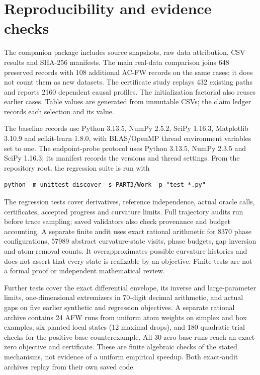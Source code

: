 \section{Reproducibility and evidence checks}
\label{app:reproduction}
The companion package includes source snapshots, raw data attribution,
CSV results and SHA-256 manifests. The main real-data comparison
joins 648 preserved records with 108 additional AC-FW records on the
same cases; it does not count them as new datasets.
The certificate study replays 432 existing paths and reports 2160
dependent causal profiles. The initialization factorial also reuses
earlier cases. Table values are generated from immutable CSVs; the
claim ledger records each selection and its value.

The baseline records use Python 3.13.5, NumPy 2.5.2, SciPy 1.16.3,
Matplotlib 3.10.9 and scikit-learn 1.8.0, with BLAS/OpenMP thread
environment variables set to one. The endpoint-probe protocol uses
Python 3.13.5, NumPy 2.3.5 and SciPy 1.16.3; its manifest records the
versions and thread settings. From the repository root, the regression
suite is run with
\begin{verbatim}
python -m unittest discover -s PART3/Work -p "test_*.py"
\end{verbatim}
The regression tests cover derivatives, reference independence, actual oracle
calls, certificates, accepted progress and curvature limits. Full
trajectory audits run before trace sampling; saved validators also
check provenance and budget accounting.
A separate finite audit uses exact rational arithmetic for 8370
phase configurations, 57989 abstract curvature-state visits, phase
budgets, gap inversion and atom-removal counts. It overapproximates
possible curvature histories and does not assert that every state
is realizable by an objective. Finite tests are not a formal proof
or independent mathematical review.

Further tests cover the exact differential envelope, its
inverse and large-parameter limits, one-dimensional extremizers in
70-digit decimal arithmetic, and actual gaps on five earlier synthetic
and regression objectives. A separate rational archive contains 24
AFW runs from uniform atom weights on simplex and box examples, six planted
local states (12 maximal drops), and 180 quadratic trial checks for
the positive-base counterexample. All 30 zero-base runs reach an
exact zero objective and certificate. These are finite algebraic
checks of the stated mechanisms, not evidence of a uniform empirical
speedup. Both exact-audit archives replay from their own saved code.

